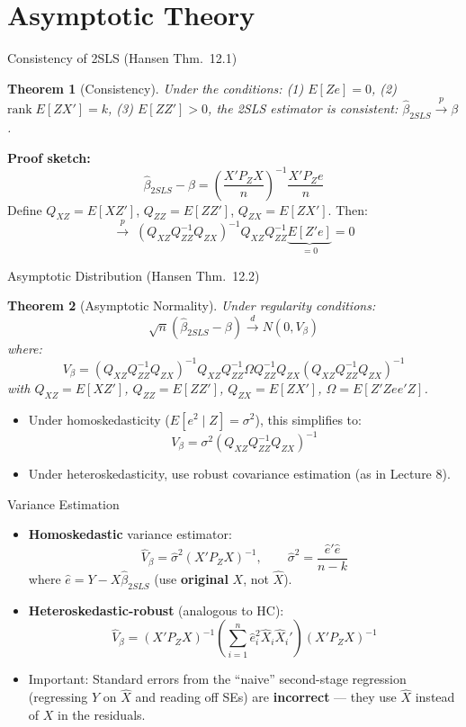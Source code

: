 \documentclass[aspectratio=169, handout]{beamer}
\newtheorem{thm}{Theorem}
\numberwithin{equation}{section}
\begin{document}
\section{Asymptotic Theory}

\begin{frame}{Consistency of 2SLS (Hansen Thm.\ 12.1)}
\begin{thm}[Consistency]
Under the conditions: (1) $E[Ze]=0$, (2) $\text{rank}\;E[ZX']=k$, (3) $E[ZZ']>0$, the 2SLS estimator is consistent: $\hat{\beta}_{2SLS}\xrightarrow{p}\beta$.
\end{thm}
\vspace{0.2cm}
\textbf{Proof sketch:}
$$\hat{\beta}_{2SLS}-\beta = \left(\frac{X'P_ZX}{n}\right)^{-1}\frac{X'P_Ze}{n}$$
Define $Q_{XZ}=E[XZ']$, $Q_{ZZ}=E[ZZ']$, $Q_{ZX}=E[ZX']$.  Then:
$$\xrightarrow{p}\; (Q_{XZ}Q_{ZZ}^{-1}Q_{ZX})^{-1}Q_{XZ}Q_{ZZ}^{-1}\underbrace{E[Z'e]}_{=0} = 0$$
\end{frame}


\begin{frame}{Asymptotic Distribution (Hansen Thm.\ 12.2)}
\begin{thm}[Asymptotic Normality]
Under regularity conditions:
$$\sqrt{n}(\hat{\beta}_{2SLS}-\beta)\xrightarrow{d} N(0, V_\beta)$$
where:
$$V_\beta = (Q_{XZ}Q_{ZZ}^{-1}Q_{ZX})^{-1}Q_{XZ}Q_{ZZ}^{-1}\Omega Q_{ZZ}^{-1}Q_{ZX}(Q_{XZ}Q_{ZZ}^{-1}Q_{ZX})^{-1}$$
with $Q_{XZ}=E[XZ']$, $Q_{ZZ}=E[ZZ']$, $Q_{ZX}=E[ZX']$, $\Omega=E[Z'Zee'Z]$.
\end{thm}
\begin{itemize}
\item Under homoskedasticity ($E[e^2\mid Z]=\sigma^2$), this simplifies to:
$$V_\beta = \sigma^2(Q_{XZ}Q_{ZZ}^{-1}Q_{ZX})^{-1}$$
\item Under heteroskedasticity, use robust covariance estimation (as in Lecture 8).
\end{itemize}
\end{frame}


\begin{frame}{Variance Estimation}
\begin{itemize}
\item \textbf{Homoskedastic} variance estimator:
$$\hat{V}_\beta = \hat{\sigma}^2(X'P_ZX)^{-1}, \qquad \hat{\sigma}^2 = \frac{\hat{e}'\hat{e}}{n-k}$$
where $\hat{e}=Y-X\hat{\beta}_{2SLS}$ (use \textbf{original} $X$, not $\hat{X}$).
\item \textbf{Heteroskedastic-robust} (analogous to HC):
$$\hat{V}_\beta = (X'P_ZX)^{-1}\left(\sum_{i=1}^n \hat{e}_i^2 \hat{X}_i\hat{X}_i'\right)(X'P_ZX)^{-1}$$
\item \alert{Important:} Standard errors from the ``naive'' second-stage regression (regressing $Y$ on $\hat{X}$ and reading off SEs) are \textbf{incorrect} --- they use $\hat{X}$ instead of $X$ in the residuals.
\end{itemize}
\end{frame}
\end{document}
